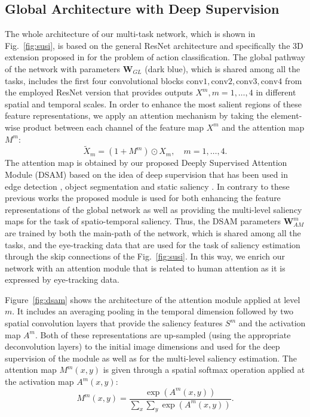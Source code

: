\documentclass[10pt,twocolumn,letterpaper]{article}
\begin{document}
\subsection{Global Architecture with Deep Supervision}
The whole architecture of our multi-task network, which is shown in Fig.~\ref{fig:susi}, is based on the general ResNet architecture \cite{he2016deep} and specifically the 3D extension proposed in \cite{hara2018can} for the problem of action classification. The global pathway of the network with parameters $\mathbf{W}_{GL}$ (dark blue), which is shared among all the tasks, includes the first four convolutional blocks $\mathrm{conv1, conv2, conv3, conv4}$ from the employed ResNet version that provides outputs $X^m, m=1,\ldots,4$ in different spatial and temporal scales. In order to enhance the most salient regions of these feature representations, we apply an attention mechanism by taking the element-wise product between each channel of the feature map $X^m$ and the attention map $M^m$:     
\begin{equation}
\tilde{X}_m = (1+M^m)\odot X_m, \quad m=1,\ldots,4.
\end{equation}
The attention map is obtained by our proposed Deeply Supervised Attention Module (DSAM) based on the idea of deep supervision that has been used in edge detection \cite{xie2015holistically}, object segmentation \cite{Cae+17} and static saliency \cite{wang2018deep}. In contrary to these previous works the proposed module is used for both enhancing the feature representations of the global network as well as providing the multi-level saliency maps for the task of spatio-temporal saliency. Thus, the DSAM parameters $\mathbf{W}_{AM}^m$ are trained by both the main-path of the network, which is shared among all the tasks, and the eye-tracking data that are used for the task of saliency estimation through the skip connections of the Fig.~\ref{fig:susi}. In this way, we enrich our network with an attention module that is related to human attention as it is expressed by eye-tracking data.

Figure~\ref{fig:dsam} shows the architecture of the attention module applied at level $m$. It includes an averaging pooling in the temporal dimension followed by two spatial convolution layers that provide the saliency features $S^m$ and the activation map $A^m$. Both of these representations are up-sampled (using the appropriate deconvolution layers) to the initial image dimensions and used for the deep supervision of the module as well as for the multi-level saliency estimation. The attention map $M^m(x,y)$ is given through a spatial softmax operation applied at the activation map $A^m(x,y)$:
\begin{equation}
M^m(x,y) = \frac{\exp(A^m(x,y))}{\sum_x \sum_y \exp(A^m(x,y))}.
\end{equation}
\end{document}
